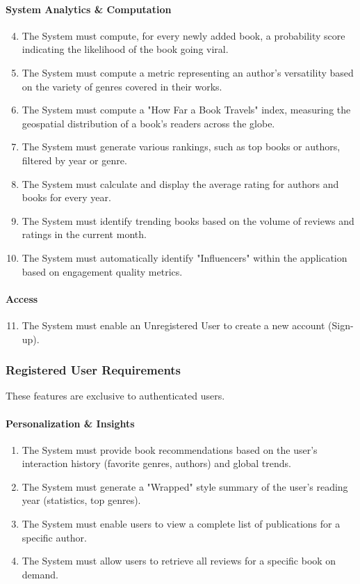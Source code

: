\paragraph{System Analytics \& Computation}
\begin{enumerate}
    \setcounter{enumi}{3} %
    \item The System must compute, for every newly added book, a probability score indicating the likelihood of the book going viral.
    \item The System must compute a metric representing an author's versatility based on the variety of genres covered in their works.
    \item The System must compute a "How Far a Book Travels" index, measuring the geospatial distribution of a book's readers across the globe.
    \item The System must generate various rankings, such as top books or authors, filtered by year or genre.
    \item The System must calculate and display the average rating for authors and books for every year.
    \item The System must identify trending books based on the volume of reviews and ratings in the current month.
    \item The System must automatically identify "Influencers" within the application based on engagement quality metrics.
\end{enumerate}

\paragraph{Access}
\begin{enumerate}
    \setcounter{enumi}{10} %
    \item The System must enable an Unregistered User to create a new account (Sign-up).
\end{enumerate}

\subsubsection{Registered User Requirements}
These features are exclusive to authenticated users.

\paragraph{Personalization \& Insights}
\begin{enumerate}
    \item The System must provide book recommendations based on the user's interaction history (favorite genres, authors) and global trends.
    \item The System must generate a "Wrapped" style summary of the user's reading year (statistics, top genres).
    \item The System must enable users to view a complete list of publications for a specific author.
    \item The System must allow users to retrieve all reviews for a specific book on demand.
\end{enumerate}

